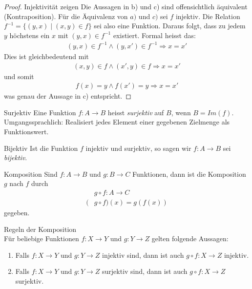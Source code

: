 \begin{proof}{Injektivität zeigen}
    Die Aussagen in b) und c) sind offensichtlich äquivalent (Kontraposition). Für die Äquivalenz von $a)$ und $c)$ sei $f$ injektiv. Die Relation $f^{-1}=\{(y,x)\mid (x,y)\in f\}$ sei also eine Funktion. Daraus folgt, dass zu jedem $y$ höchstens ein $x$ mit $(y,x)\in f^{-1}$ existiert. Formal heisst das:
    \begin{align*}
        (y,x)\in f^{-1}\land (y,x')\in f^{-1}\Rightarrow x=x'
    \end{align*}
    Dies ist gleichbedeutend mit
    \begin{align*}
        (x,y)\in f\land (x',y)\in f\Rightarrow x=x'
    \end{align*}
    und somit
    \begin{align*}
        f(x)=y\land f(x')=y\Rightarrow x=x'
    \end{align*}
    was genau der Aussage in c) entspricht.
\end{proof}

\begin{definition}{Surjektiv}
    Eine Funktion $f:A\to B$ heisst \textit{surjektiv} auf $B$, wenn $B=Im(f)$.\\
    Umgangssprachlich: Realisiert jedes Element einer gegebenen Zielmenge als Funktionswert.
\end{definition}

\begin{definition}{Bijektiv}
    Ist die Funktion $f$ injektiv und surjektiv, so sagen wir $f:A\to B$ sei \textit{bijektiv}.
\end{definition}

\begin{definition}{Komposition}
    Sind $f:A\to B$ und $g:B\to C$ Funktionen, dann ist die Komposition $g$ nach $f$ durch
    \begin{align*}
        &g\circ f:A\to C\\
        (&g\circ f)(x)=g(f(x))
    \end{align*}
    gegeben.
\end{definition}

\begin{lemma}{Regeln der Komposition}\\
    Für beliebige Funktionen $f:X\to Y$ und $g:Y\to Z$ gelten folgende Aussagen:
    \begin{enumerate}
        \item Falls $f:X\to Y$ und $g:Y\to Z$ injektiv sind, dann ist auch $g\circ f:X\to Z$ injektiv.
        \item Falls $f:X\to Y$ und $g:Y\to Z$ surjektiv sind, dann ist auch $g\circ f:X\to Z$ surjektiv.
    \end{enumerate}
\end{lemma}

